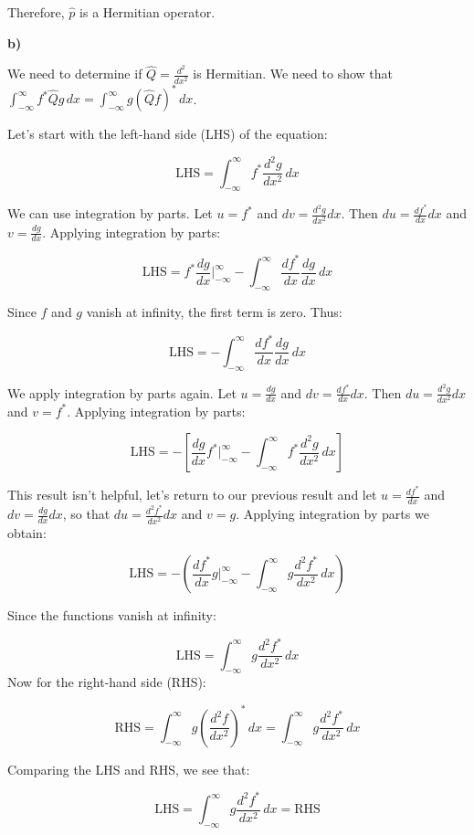 \documentclass{article}
\begin{document}
Therefore, $\hat{p}$ is a Hermitian operator.

\textbf{b)}

We need to determine if $\hat{Q} = \frac{d^2}{dx^2}$ is Hermitian. We need to show that $\int_{-\infty}^{\infty} f^* \hat{Q} g \, dx = \int_{-\infty}^{\infty} g (\hat{Q} f)^* \, dx$.

Let's start with the left-hand side (LHS) of the equation:

\[
\text{LHS} = \int_{-\infty}^{\infty} f^* \frac{d^2 g}{dx^2} \, dx
\]

We can use integration by parts. Let $u = f^*$ and $dv = \frac{d^2 g}{dx^2} dx$. Then $du = \frac{df^*}{dx} dx$ and $v = \frac{dg}{dx}$. Applying integration by parts:

\[
\text{LHS} = f^* \frac{dg}{dx} \Big|_{-\infty}^{\infty} - \int_{-\infty}^{\infty} \frac{df^*}{dx} \frac{dg}{dx} \, dx
\]

Since $f$ and $g$ vanish at infinity, the first term is zero. Thus:

\[
\text{LHS} = - \int_{-\infty}^{\infty} \frac{df^*}{dx} \frac{dg}{dx} \, dx
\]

We apply integration by parts again. Let $u = \frac{dg}{dx}$ and $dv = \frac{df^*}{dx} dx$. Then $du = \frac{d^2 g}{dx^2} dx$ and $v = f^*$. Applying integration by parts:

\[
\text{LHS} = - \left[ \frac{dg}{dx} f^* \Big|_{-\infty}^{\infty} - \int_{-\infty}^{\infty} f^* \frac{d^2g}{dx^2} \, dx \right]
\]

This result isn't helpful, let's return to our previous result and let $u = \frac{df^*}{dx}$ and $dv = \frac{dg}{dx}dx$, so that $du = \frac{d^2f^*}{dx^2}dx$ and $v=g$. Applying integration by parts we obtain:

\[
\text{LHS} = -\left( \frac{df^*}{dx} g \Big|_{-\infty}^{\infty} - \int_{-\infty}^{\infty} g \frac{d^2f^*}{dx^2} \, dx \right)
\]

Since the functions vanish at infinity:

\[
\text{LHS} = \int_{-\infty}^{\infty} g \frac{d^2 f^*}{dx^2} \, dx
\]
Now for the right-hand side (RHS):

\[
\text{RHS} = \int_{-\infty}^{\infty} g \left(\frac{d^2 f}{dx^2}\right)^* \, dx = \int_{-\infty}^{\infty} g \frac{d^2 f^*}{dx^2} \, dx
\]

Comparing the LHS and RHS, we see that:

\[
\text{LHS} = \int_{-\infty}^{\infty} g \frac{d^2 f^*}{dx^2} \, dx = \text{RHS}
\]
\end{document}

